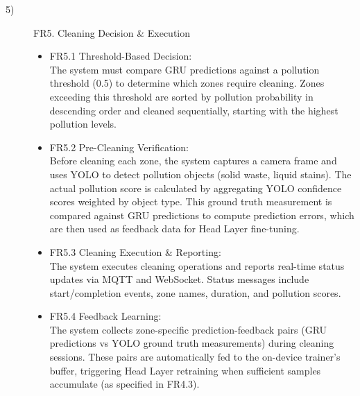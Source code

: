 \documentclass[conference]{IEEEtran}
\begin{document}
\begin{description}
    \item[5)] FR5. Cleaning Decision \& Execution
    \begin{itemize}
        \item FR5.1 Threshold-Based Decision: \\
        The system must compare GRU predictions against a pollution threshold (0.5) to determine which zones require cleaning. Zones exceeding this threshold are sorted by pollution probability in descending order and cleaned sequentially, starting with the highest pollution levels.
        \item FR5.2 Pre-Cleaning Verification: \\
        Before cleaning each zone, the system captures a camera frame and uses YOLO to detect pollution objects (solid waste, liquid stains). The actual pollution score is calculated by aggregating YOLO confidence scores weighted by object type. This ground truth measurement is compared against GRU predictions to compute prediction errors, which are then used as feedback data for Head Layer fine-tuning.
        \item FR5.3 Cleaning Execution \& Reporting: \\
        The system executes cleaning operations and reports real-time status updates via MQTT and WebSocket. Status messages include start/completion events, zone names, duration, and pollution scores.
        \item FR5.4 Feedback Learning: \\
        The system collects zone-specific prediction-feedback pairs (GRU predictions vs YOLO ground truth measurements) during cleaning sessions. These pairs are automatically fed to the on-device trainer's buffer, triggering Head Layer retraining when sufficient samples accumulate (as specified in FR4.3).
    \end{itemize}

\end{description}
\end{document}
